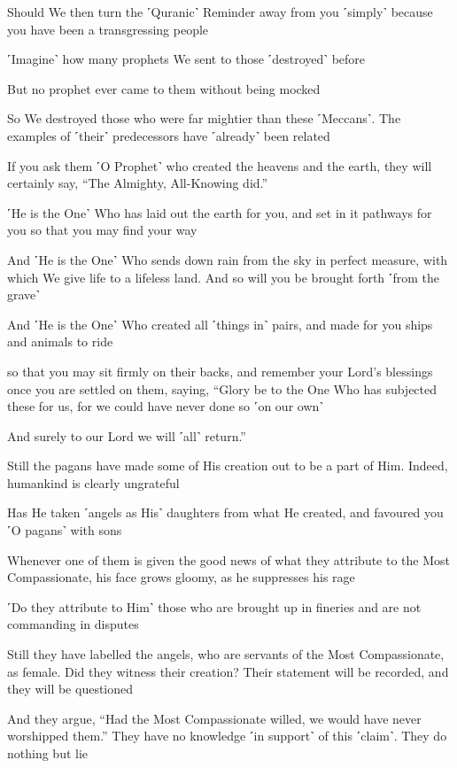 Should We then turn the ˹Quranic˺ Reminder away from you ˹simply˺ because you have been a transgressing people

˹Imagine˺ how many prophets We sent to those ˹destroyed˺ before

But no prophet ever came to them without being mocked

So We destroyed those who were far mightier than these ˹Meccans˺. The examples of ˹their˺ predecessors have ˹already˺ been related

If you ask them ˹O Prophet˺ who created the heavens and the earth, they will certainly say, “The Almighty, All-Knowing did.”

˹He is the One˺ Who has laid out the earth for you, and set in it pathways for you so that you may find your way

And ˹He is the One˺ Who sends down rain from the sky in perfect measure, with which We give life to a lifeless land. And so will you be brought forth ˹from the grave˺

And ˹He is the One˺ Who created all ˹things in˺ pairs, and made for you ships and animals to ride

so that you may sit firmly on their backs, and remember your Lord’s blessings once you are settled on them, saying, “Glory be to the One Who has subjected these for us, for we could have never done so ˹on our own˺

And surely to our Lord we will ˹all˺ return.”

Still the pagans have made some of His creation out to be a part of Him. Indeed, humankind is clearly ungrateful

Has He taken ˹angels as His˺ daughters from what He created, and favoured you ˹O pagans˺ with sons

Whenever one of them is given the good news of what they attribute to the Most Compassionate, his face grows gloomy, as he suppresses his rage

˹Do they attribute to Him˺ those who are brought up in fineries and are not commanding in disputes

Still they have labelled the angels, who are servants of the Most Compassionate, as female. Did they witness their creation? Their statement will be recorded, and they will be questioned

And they argue, “Had the Most Compassionate willed, we would have never worshipped them.” They have no knowledge ˹in support˺ of this ˹claim˺. They do nothing but lie

